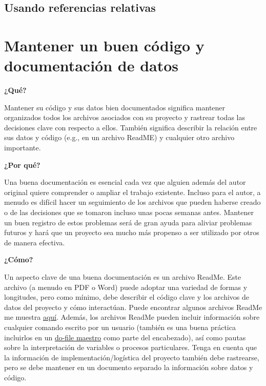 \documentclass[11pt,en]{elegantpaper}
\begin{document}
\subsection{Usando referencias relativas}
\label{sec:refrelativas}

\newpage 
\section{Mantener un buen código y documentación de datos}
\label{sec:documentacion}
\textbf{¿Qué?}

Mantener su código y sus datos bien documentados significa mantener organizados todos los archivos asociados con su proyecto y rastrear todas las decisiones clave con respecto a ellos. También significa describir la relación entre sus datos y código (e.g., en un archivo ReadME) y cualquier otro archivo importante.

\textbf{¿Por qué?}

Una buena documentación es esencial cada vez que alguien además del autor original quiere comprender o ampliar el trabajo existente. Incluso para el autor, a menudo es difícil hacer un seguimiento de los archivos que pueden haberse creado o de las decisiones que se tomaron incluso unas pocas semanas antes. Mantener un buen registro de estos problemas será de gran ayuda para aliviar problemas futuros y hará que un proyecto sea mucho más propenso a ser utilizado por otros de manera efectiva.

\textbf{¿Cómo?}

Un aspecto clave de una buena documentación es un archivo ReadMe. Este archivo (a menudo en PDF o Word) puede adoptar una variedad de formas y longitudes, pero como mínimo, debe describir el código clave y los archivos de datos del proyecto y cómo interactúan. Puede encontrar algunos archivos ReadMe me muestra \href{http://www.poverty-action.org/research-transparency/example-readme-files}{aquí}. Además, los archivos ReadMe pueden incluir información sobre cualquier comando escrito por un usuario (también es una buena práctica incluirlos en un \href{http://www.poverty-action.org/research-transparency/example-master}{do-file maestro} como parte del encabezado), así como pautas sobre la interpretación de variables o procesos particulares. Tenga en cuenta que la información de implementación/logística del proyecto también debe rastrearse, pero se debe mantener en un documento separado la información sobre datos y código.
\end{document}

